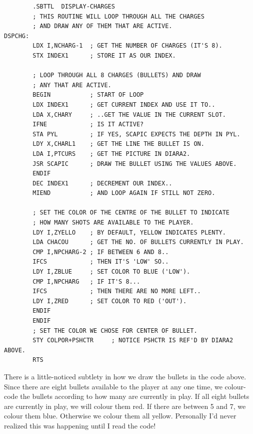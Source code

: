 \begin{lstlisting}
        .SBTTL  DISPLAY-CHARGES
        ; THIS ROUTINE WILL LOOP THROUGH ALL THE CHARGES
        ; AND DRAW ANY OF THEM THAT ARE ACTIVE.
DSPCHG:
        LDX I,NCHARG-1  ; GET THE NUMBER OF CHARGES (IT'S 8).
        STX INDEX1      ; STORE IT AS OUR INDEX.

        ; LOOP THROUGH ALL 8 CHARGES (BULLETS) AND DRAW
        ; ANY THAT ARE ACTIVE.
        BEGIN           ; START OF LOOP
        LDX INDEX1      ; GET CURRENT INDEX AND USE IT TO..
        LDA X,CHARY     ; ..GET THE VALUE IN THE CURRENT SLOT.
        IFNE            ; IS IT ACTIVE?
        STA PYL         ; IF YES, SCAPIC EXPECTS THE DEPTH IN PYL.
        LDY X,CHARL1    ; GET THE LINE THE BULLET IS ON.
        LDA I,PTCURS    ; GET THE PICTURE IN DIARA2.
        JSR SCAPIC      ; DRAW THE BULLET USING THE VALUES ABOVE.
        ENDIF
        DEC INDEX1      ; DECREMENT OUR INDEX..
        MIEND           ; AND LOOP AGAIN IF STILL NOT ZERO.

        ; SET THE COLOR OF THE CENTRE OF THE BULLET TO INDICATE
        ; HOW MANY SHOTS ARE AVAILABLE TO THE PLAYER.
        LDY I,ZYELLO    ; BY DEFAULT, YELLOW INDICATES PLENTY.
        LDA CHACOU      ; GET THE NO. OF BULLETS CURRENTLY IN PLAY.
        CMP I,NPCHARG-2 ; IF BETWEEN 6 AND 8..
        IFCS            ; THEN IT'S 'LOW' SO..
        LDY I,ZBLUE     ; SET COLOR TO BLUE ('LOW').
        CMP I,NPCHARG   ; IF IT'S 8...
        IFCS            ; THEN THERE ARE NO MORE LEFT..
        LDY I,ZRED      ; SET COLOR TO RED ('OUT').
        ENDIF
        ENDIF
        ; SET THE COLOR WE CHOSE FOR CENTER OF BULLET.
        STY COLPOR+PSHCTR     ; NOTICE PSHCTR IS REF'D BY DIARA2 ABOVE.
        RTS
\end{lstlisting}

There is a little-noticed subtlety in how we draw the bullets in the code above. Since
there are eight bullets available to the player at any one time, we colour-code the bullets
according to how many are currently in play. If all eight bullets are currently in play, we
will colour them red. If there are between 5 and 7, we colour them blue. Otherwise we colour
them all yellow. Personally I'd never realized this was happening until I read the code!

